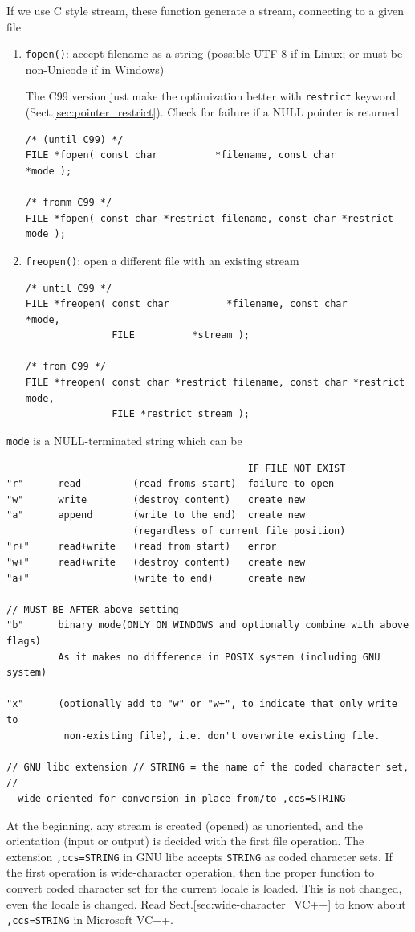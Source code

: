 If we use C style stream, these function generate a stream, connecting
to a given file
\begin{enumerate}
  \item \verb!fopen()!: accept filename as a string (possible UTF-8 if in
  Linux; or must be non-Unicode if in Windows)
  
The C99 version just make the optimization better with \verb!restrict! keyword
(Sect.\ref{sec:pointer_restrict}). Check for failure if a NULL pointer is
returned
\begin{lstlisting}
/* (until C99) */
FILE *fopen( const char          *filename, const char          *mode );

/* fromm C99 */
FILE *fopen( const char *restrict filename, const char *restrict mode );
\end{lstlisting}  

  \item \verb!freopen()!: open a different file with an existing stream
\begin{verbatim}
/* until C99 */
FILE *freopen( const char          *filename, const char          *mode, 
               FILE          *stream );

/* from C99 */
FILE *freopen( const char *restrict filename, const char *restrict mode, 
               FILE *restrict stream );
\end{verbatim}
\end{enumerate}
\verb!mode! is a NULL-terminated string which can be
\begin{verbatim}
                                          IF FILE NOT EXIST
"r"      read         (read froms start)  failure to open
"w"      write        (destroy content)   create new
"a"      append       (write to the end)  create new
                      (regardless of current file position)
"r+"     read+write   (read from start)   error
"w+"     read+write   (destroy content)   create new
"a+"                  (write to end)      create new

// MUST BE AFTER above setting
"b"      binary mode(ONLY ON WINDOWS and optionally combine with above flags)
         As it makes no difference in POSIX system (including GNU system)
          
"x"      (optionally add to "w" or "w+", to indicate that only write to
          non-existing file), i.e. don't overwrite existing file.
   
// GNU libc extension // STRING = the name of the coded character set, //       
  wide-oriented for conversion in-place from/to ,ccs=STRING
\end{verbatim}
At the beginning, any stream is created (opened) as unoriented, and the
orientation (input or output) is decided with the first file operation.
The extension \verb!,ccs=STRING! in GNU libc accepts \verb!STRING! as coded
character sets. If the first operation is wide-character operation, then the
proper function to convert coded character set for the current locale is loaded.
This is not changed, even the locale is changed. Read
Sect.\ref{sec:wide-character_VC++} to know about \verb!,ccs=STRING! in Microsoft
VC++. 

